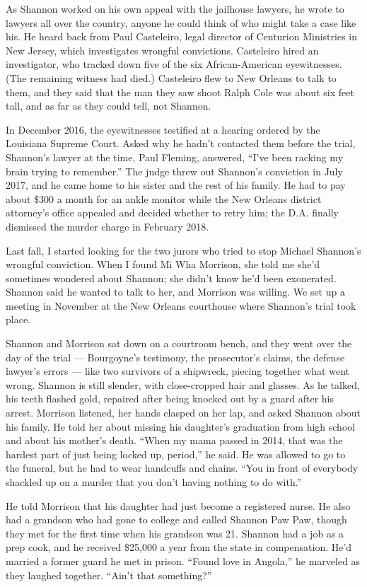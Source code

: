 As Shannon worked on his own appeal with the jailhouse lawyers, he wrote
to lawyers all over the country, anyone he could think of who might take
a case like his. He heard back from Paul Casteleiro, legal director of
Centurion Ministries in New Jersey, which investigates wrongful
convictions. Casteleiro hired an investigator, who tracked down five of
the six African-American eyewitnesses. (The remaining witness had died.)
Casteleiro flew to New Orleans to talk to them, and they said that the
man they saw shoot Ralph Cole was about six feet tall, and as far as
they could tell, not Shannon.

In December 2016, the eyewitnesses testified at a hearing ordered by the
Louisiana Supreme Court. Asked why he hadn't contacted them before the
trial, Shannon's lawyer at the time, Paul Fleming, answered, ``I've been
racking my brain trying to remember.'' The judge threw out Shannon's
conviction in July 2017, and he came home to his sister and the rest of
his family. He had to pay about \$300 a month for an ankle monitor while
the New Orleans district attorney's office appealed and decided whether
to retry him; the D.A. finally dismissed the murder charge in February
2018.

Last fall, I started looking for the two jurors who tried to stop
Michael Shannon's wrongful conviction. When I found Mi Wha Morrison, she
told me she'd sometimes wondered about Shannon; she didn't know he'd
been exonerated. Shannon said he wanted to talk to her, and Morrison was
willing. We set up a meeting in November at the New Orleans courthouse
where Shannon's trial took place.

Shannon and Morrison sat down on a courtroom bench, and they went over
the day of the trial --- Bourgoyne's testimony, the prosecutor's claims,
the defense lawyer's errors --- like two survivors of a shipwreck,
piecing together what went wrong. Shannon is still slender, with
close-cropped hair and glasses. As he talked, his teeth flashed gold,
repaired after being knocked out by a guard after his arrest. Morrison
listened, her hands clasped on her lap, and asked Shannon about his
family. He told her about missing his daughter's graduation from high
school and about his mother's death. ``When my mama passed in 2014, that
was the hardest part of just being locked up, period,'' he said. He was
allowed to go to the funeral, but he had to wear handcuffs and chains.
``You in front of everybody shackled up on a murder that you don't
having nothing to do with.''

He told Morrison that his daughter had just become a registered nurse.
He also had a grandson who had gone to college and called Shannon Paw
Paw, though they met for the first time when his grandson was 21.
Shannon had a job as a prep cook, and he received \$25,000 a year from
the state in compensation. He'd married a former guard he met in prison.
``Found love in Angola,'' he marveled as they laughed together. ``Ain't
that something?''

